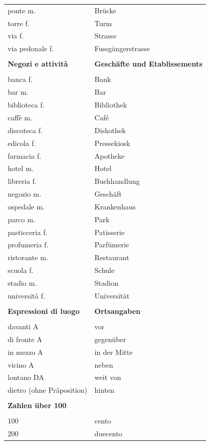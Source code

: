 \documentclass[10pt]{scrartcl}
\begin{document}
\begin{multicols*}{2}
\begin{supertabular}{p{4cm}p{4cm}}
ponte \hfill m. & Brücke\\
torre \hfill f. & Turm\\
via \hfill f. & Strasse\\
via pedonale \hfill f. & Fussgängerstrasse\\
\\
\textbf{Negozi e attività} & \textbf{Geschäfte und Etablissements}\\
\\
banca \hfill f. & Bank\\
bar \hfill m. & Bar\\
biblioteca \hfill f. & Bibliothek\\
caffè \hfill m. & Café\\
discoteca \hfill f. & Diskothek\\
edicola \hfill f. & Pressekiosk\\
farmacia \hfill f. & Apotheke\\
hotel \hfill m. & Hotel\\
libreria \hfill f. & Buchhandlung\\
negozio \hfill m. & Geschäft\\
ospedale \hfill m. & Krankenhaus\\
parco \hfill m. & Park\\
pasticceria \hfill f. & Patisserie\\
profumeria \hfill f. & Parfümerie\\
ristorante  \hfill m. & Restaurant\\
scuola \hfill f. & Schule\\
stadio \hfill m. & Stadion\\
università \hfill f. & Universität\\
\\
\textbf{Espressioni di luogo} & \textbf{Ortsangaben}\\
\\
davanti A & vor\\
di fronte A & gegenüber\\
in mezzo A & in der Mitte\\
vicino A & neben\\
lontano DA & weit von\\
dietro (ohne Präposition) & hinten\\
\\
\textbf{Zahlen über 100}\\
\\
100 & cento\\
200 & duecento\\

\end{supertabular}
\end{multicols*}
\end{document}
